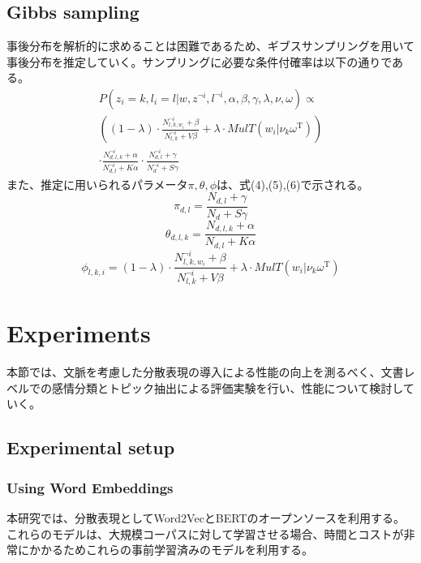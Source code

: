 \documentclass[uplatex]{jsarticle}
\begin{document}
\subsection{Gibbs sampling}
事後分布を解析的に求めることは困難であるため、ギブスサンプリングを用いて事後分布を推定していく。サンプリングに必要な条件付確率は以下の通りである。
\begin{multline}
    P(z_{i} = k,l_{i} = l| w, z^{\neg{i}}, l^{\neg{i}}, \alpha, \beta, \gamma, \lambda, \nu, \omega) \propto
    \\ \left((1-\lambda) \cdot \frac{N_{l,k,w_{i}}^{\neg{i}} + \beta}{N_{l,k}^{\neg{i}} + V\beta} + \lambda \cdot MulT(w_{i}|\nu_{k}\omega^{\mathrm{T}})\right)
    \\ \cdot \frac{N_{d,l,k}^{\neg{i}} + \alpha}{N_{d,l}^{\neg{i}} + K\alpha} \cdot \frac{N_{d,l}^{\neg{i}} + \gamma}{N_{d}^{\neg{i}} + S\gamma}
\end{multline}
また、推定に用いられるパラメータ$\pi,\theta,\phi$は、式(4),(5),(6)で示される。
\begin{equation}
    \pi_{d,l} = \frac{N_{d,l} + \gamma}{N_{d} + S\gamma}
\end{equation}
\begin{equation}
    \theta_{d,l,k} = \frac{N_{d,l,k} + \alpha}{N_{d,l} + K\alpha}
\end{equation}
\begin{equation}
    \phi_{l,k,i} = (1-\lambda) \cdot \frac{N_{l,k,w_{i}}^{\neg{i}} + \beta}{N_{l,k}^{\neg{i}} + V\beta} + \lambda \cdot MulT(w_{i}|\nu_{k}\omega^{\mathrm{T}})
\end{equation}

\section{Experiments}
本節では、文脈を考慮した分散表現の導入による性能の向上を測るべく、文書レベルでの感情分類とトピック抽出による評価実験を行い、性能について検討していく。
\subsection{Experimental setup}
\subsubsection{Using Word Embeddings}
本研究では、分散表現としてWord2VecとBERTのオープンソースを利用する。
これらのモデルは、大規模コーパスに対して学習させる場合、時間とコストが非常にかかるためこれらの事前学習済みのモデルを利用する。
\end{document}
